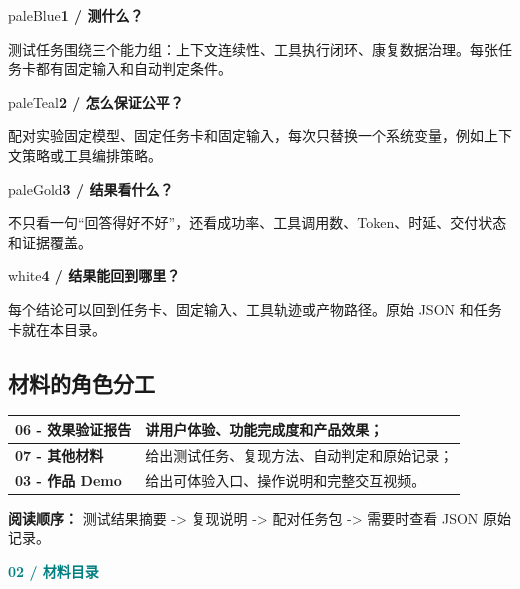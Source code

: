 \documentclass[UTF8,11pt,a4paper]{ctexart}
\newcommand{\kicker}[1]{\textcolor{teal}{\textbf{\small\MakeUppercase{#1}}}\par\vspace{1mm}}
\begin{document}
\begin{card}[colframe=blue]{paleBlue}\textbf{1  /  测什么？}\par 测试任务围绕三个能力组：上下文连续性、工具执行闭环、康复数据治理。每张任务卡都有固定输入和自动判定条件。\end{card}
\begin{card}[colframe=teal]{paleTeal}\textbf{2  /  怎么保证公平？}\par 配对实验固定模型、固定任务卡和固定输入，每次只替换一个系统变量，例如上下文策略或工具编排策略。\end{card}
\begin{card}[colframe=orange]{paleGold}\textbf{3  /  结果看什么？}\par 不只看一句“回答得好不好”，还看成功率、工具调用数、Token、时延、交付状态和证据覆盖。\end{card}
\begin{card}[colframe=violet]{white}\textbf{4  /  结果能回到哪里？}\par 每个结论可以回到任务卡、固定输入、工具轨迹或产物路径。原始 JSON 和任务卡就在本目录。\end{card}

\subsection*{材料的角色分工}
\begin{tabularx}{\textwidth}{@{}p{35mm} X@{}}
\toprule
\textbf{06 - 效果验证报告} & 讲用户体验、功能完成度和产品效果；\\
\midrule
\textbf{07 - 其他材料} & 给出测试任务、复现方法、自动判定和原始记录；\\
\midrule
\textbf{03 - 作品 Demo} & 给出可体验入口、操作说明和完整交互视频。\\
\bottomrule
\end{tabularx}

\vspace{6mm}
\begin{darkbox}
\textbf{阅读顺序：} 测试结果摘要 -> 复现说明 -> 配对任务包 -> 需要时查看 JSON 原始记录。
\end{darkbox}
\clearpage

\kicker{02  /  材料目录}
\end{document}
